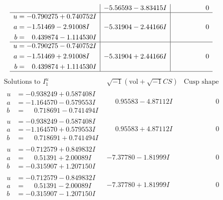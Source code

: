 \documentclass[1p]{elsarticle_modified}
\theoremstyle{definition}
\newcommand{\I}{\sqrt{-1}}
\begin{document}
$$\begin{array}{c|c|c}
 & -5.56593 - 3.83415 I & \phantom{-0.000000 } 0 \\ \hline\begin{aligned}
u &= -0.790275 + 0.740752 I \\
a &= -1.51469 - 2.91008 I \\
b &= \phantom{-}0.439874 - 1.114530 I\end{aligned}
 & -5.31904 - 2.44166 I & \phantom{-0.000000 } 0 \\ \hline\begin{aligned}
u &= -0.790275 - 0.740752 I \\
a &= -1.51469 + 2.91008 I \\
b &= \phantom{-}0.439874 + 1.114530 I\end{aligned}
 & -5.31904 + 2.44166 I & \phantom{-0.000000 } 0\\
 \hline 
 \end{array}$$\newpage$$\begin{array}{c|c|c}  
\text{Solutions to }I^u_{1}& \I (\text{vol} + \sqrt{-1}CS) & \text{Cusp shape}\\
 \hline 
\begin{aligned}
u &= -0.938249 + 0.587408 I \\
a &= -1.164570 - 0.579553 I \\
b &= \phantom{-}0.718691 - 0.741494 I\end{aligned}
 & \phantom{-}0.95583 - 4.87112 I & \phantom{-0.000000 } 0 \\ \hline\begin{aligned}
u &= -0.938249 - 0.587408 I \\
a &= -1.164570 + 0.579553 I \\
b &= \phantom{-}0.718691 + 0.741494 I\end{aligned}
 & \phantom{-}0.95583 + 4.87112 I & \phantom{-0.000000 } 0 \\ \hline\begin{aligned}
u &= -0.712579 + 0.849832 I \\
a &= \phantom{-}0.51391 + 2.00089 I \\
b &= -0.315907 + 1.207150 I\end{aligned}
 & -7.37780 - 1.81999 I & \phantom{-0.000000 } 0 \\ \hline\begin{aligned}
u &= -0.712579 - 0.849832 I \\
a &= \phantom{-}0.51391 - 2.00089 I \\
b &= -0.315907 - 1.207150 I\end{aligned}
 & -7.37780 + 1.81999 I & \phantom{-0.000000 } 0 \\ \hline\begin{aligned}

\end{aligned}
\end{array}$$
\end{document}
